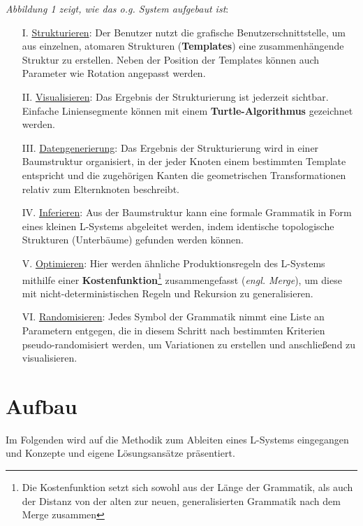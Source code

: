 \textit{Abbildung 1 zeigt, wie das o.g. System aufgebaut ist}:
\begin{itemize}
    \item[I.] \underline{Strukturieren}: Der Benutzer nutzt die grafische Benutzerschnittstelle, um aus
    einzelnen, atomaren Strukturen (\textbf{Templates}) eine zusammenhängende Struktur zu erstellen.
    Neben der Position der Templates können auch Parameter wie Rotation angepasst
    werden.
    \item[II.] \underline{Visualisieren}: Das Ergebnis der Strukturierung ist jederzeit sichtbar.
    Einfache Liniensegmente können mit einem \textbf{Turtle-Algorithmus} gezeichnet werden.
    \item[III.] \underline{Datengenerierung}: Das Ergebnis der Strukturierung wird in einer Baumstruktur
    organisiert, in der jeder Knoten einem bestimmten Template entspricht und die zugehörigen Kanten die
    geometrischen Transformationen relativ zum Elternknoten beschreibt.
    \item[IV.] \underline{Inferieren}: Aus der Baumstruktur kann eine formale Grammatik in Form eines kleinen
    L-Systems abgeleitet werden, indem identische topologische Strukturen (Unterbäume) gefunden werden können.
    \item[V.] \underline{Optimieren}: Hier werden ähnliche Produktionsregeln des L-Systems mithilfe einer
    \textbf{Kostenfunktion}\footnote[1]{Die Kostenfunktion setzt sich sowohl aus der Länge der Grammatik, als
    auch der Distanz von der alten zur neuen, generalisierten Grammatik nach dem Merge zusammen} zusammengefasst
    (\textit{engl. Merge}), um diese mit nicht-deterministischen Regeln und Rekursion zu generalisieren.
    \item[VI.] \underline{Randomisieren}: Jedes Symbol der Grammatik nimmt eine Liste an Parametern entgegen, die
    in diesem Schritt nach bestimmten Kriterien pseudo-randomisiert werden, um Variationen zu erstellen und
    anschließend zu visualisieren.
\end{itemize}

\section{Aufbau}

Im Folgenden wird auf die Methodik zum Ableiten eines L-Systems eingegangen und Konzepte und eigene Lösungsansätze
präsentiert.

